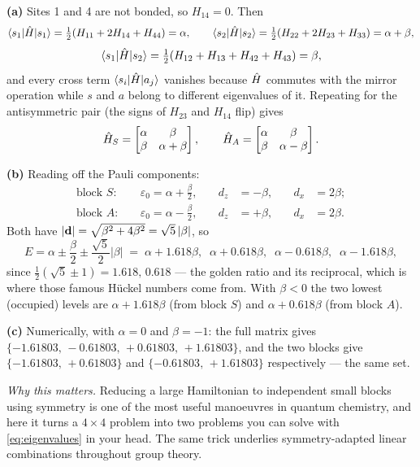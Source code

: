 \begin{solution}
\textbf{(a)} Sites 1 and 4 are not bonded, so $H_{14}=0$. Then
\[
\braket{s_1|\hat{H}|s_1} = \tfrac12(H_{11}+2H_{14}+H_{44}) = \alpha,
\qquad
\braket{s_2|\hat{H}|s_2} = \tfrac12(H_{22}+2H_{23}+H_{33}) = \alpha+\beta,
\]
\[
\braket{s_1|\hat{H}|s_2} = \tfrac12(H_{12}+H_{13}+H_{42}+H_{43}) = \beta,
\]
and every cross term $\braket{s_i|\hat{H}|a_j}$ vanishes because $\hat{H}$ commutes with the
mirror operation while $s$ and $a$ belong to different eigenvalues of it. Repeating for
the antisymmetric pair (the signs of $H_{23}$ and $H_{14}$ flip) gives
\[
\hat{H}_S = \begin{bmatrix}\alpha & \beta\\ \beta & \alpha+\beta\end{bmatrix},
\qquad
\hat{H}_A = \begin{bmatrix}\alpha & \beta\\ \beta & \alpha-\beta\end{bmatrix}.
\]

\textbf{(b)} Reading off the Pauli components:
\[
\begin{aligned}
\text{block } S:&\quad \varepsilon_0 = \alpha+\tfrac{\beta}{2}, &\quad d_z &= -\beta, &\quad d_x &= 2\beta;\\
\text{block } A:&\quad \varepsilon_0 = \alpha-\tfrac{\beta}{2}, &\quad d_z &= +\beta, &\quad d_x &= 2\beta.
\end{aligned}
\]
Both have $|\mathbf{d}| = \sqrt{\beta^2+4\beta^2} = \sqrt5\,|\beta|$, so
\[
E = \alpha \pm \frac{\beta}{2} \pm \frac{\sqrt5}{2}|\beta|
  \;=\; \alpha + 1.618\beta,\;\; \alpha+0.618\beta,\;\; \alpha-0.618\beta,\;\; \alpha-1.618\beta,
\]
since $\tfrac12(\sqrt5\pm1) = 1.618,\,0.618$ --- the golden ratio and its reciprocal,
which is where those famous H\"uckel numbers come from. With $\beta<0$ the two lowest
(occupied) levels are $\alpha+1.618\beta$ (from block $S$) and $\alpha+0.618\beta$
(from block $A$).

\textbf{(c)} Numerically, with $\alpha=0$ and $\beta=-1$: the full matrix gives
$\{-1.61803,\,-0.61803,\,+0.61803,\,+1.61803\}$, and the two blocks give
$\{-1.61803,\,+0.61803\}$ and $\{-0.61803,\,+1.61803\}$ respectively --- the same set.

\smallskip\noindent
\emph{Why this matters.} Reducing a large Hamiltonian to independent small blocks using
symmetry is one of the most useful manoeuvres in quantum chemistry, and here it turns a
$4\times4$ problem into two problems you can solve with \cref{eq:eigenvalues} in your
head. The same trick underlies symmetry-adapted linear combinations throughout group
theory.
\end{solution}

